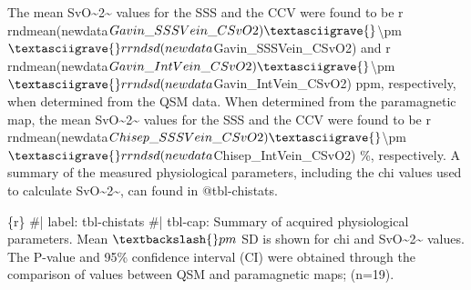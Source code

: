 \documentclass[
  letterpaper,
  DIV=11,
  numbers=noendperiod]{scrartcl}
\newenvironment{Shaded}{\begin{snugshade}}{\end{snugshade}}
\newcommand{\NormalTok}[1]{\textcolor[rgb]{0.00,0.23,0.31}{#1}}
\begin{document}
\begin{Shaded}
\begin{Highlighting}[]
\NormalTok{The mean SvO\textasciitilde{}2\textasciitilde{} values for the SSS and the CCV were found to be \textasciigrave{}r rndmean(newdata$Gavin\_SSSVein\_CSvO2)\textasciigrave{} $\textbackslash{}pm$ \textasciigrave{}r rndsd(newdata$Gavin\_SSSVein\_CSvO2)\textasciigrave{} and \textasciigrave{}r rndmean(newdata$Gavin\_IntVein\_CSvO2)\textasciigrave{} $\textbackslash{}pm$  \textasciigrave{}r rndsd(newdata$Gavin\_IntVein\_CSvO2)\textasciigrave{} ppm, respectively, when determined from the QSM data. When determined from the paramagnetic map, the mean SvO\textasciitilde{}2\textasciitilde{} values for the SSS and the CCV were found to be \textasciigrave{}r rndmean(newdata$Chisep\_SSSVein\_CSvO2)\textasciigrave{} $\textbackslash{}pm$ \textasciigrave{}r rndsd(newdata$Chisep\_IntVein\_CSvO2)\textasciigrave{} \%, respectively. A summary of the measured physiological parameters, including the chi values used to calculate SvO\textasciitilde{}2\textasciitilde{}, can found in @tbl{-}chistats.}

\NormalTok{\textasciigrave{}\textasciigrave{}\textasciigrave{}\{r\}}
\NormalTok{\#| label: tbl{-}chistats}
\NormalTok{\#| tbl{-}cap: Summary of acquired physiological parameters. Mean $\textbackslash{}pm$ SD is shown for chi and SvO\textasciitilde{}2\textasciitilde{} values. The P{-}value and 95\% confidence interval (CI) were obtained through the comparison of values between QSM and paramagnetic maps; (n=19).}


\end{Highlighting}
\end{Shaded}
\end{document}
